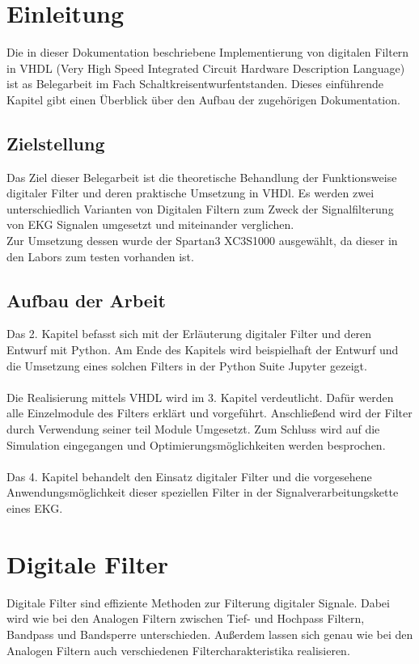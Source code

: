 \documentclass[
paper = a4,
fontsize = 11pt,
numbers=noenddot,
headsepline = true,
footsepline = true,
plainfootsepline = true,
parskip,								        %
listof = totoc,
bibliography = totoc,
index = totoc,
twoside = false
]{scrreprt}
\begin{document}
	
	
	
	\tableofcontents
	\newpage
	\listoffigures
	\newpage
	\setcounter{page}{1}
	
	\chapter{Einleitung}
	Die in dieser Dokumentation beschriebene Implementierung von digitalen Filtern in VHDL  (Very High Speed Integrated Circuit Hardware Description Language) ist as Belegarbeit im Fach \glqq Schaltkreisentwurf\grqq entstanden. Dieses einführende Kapitel gibt einen Überblick über den Aufbau der zugehörigen Dokumentation.
	
	\section{Zielstellung}
	Das Ziel dieser Belegarbeit ist die theoretische Behandlung der Funktionsweise digitaler Filter und deren praktische Umsetzung in VHDl. Es werden zwei unterschiedlich Varianten von Digitalen Filtern zum Zweck der Signalfilterung von EKG Signalen umgesetzt und miteinander verglichen.\\
	Zur Umsetzung dessen wurde der Spartan3 XC3S1000 ausgewählt, da dieser in den Labors zum testen vorhanden ist.
	\section{Aufbau der Arbeit}
	Das 2. Kapitel befasst sich mit der Erläuterung digitaler Filter und deren Entwurf mit Python. Am Ende des Kapitels wird beispielhaft der Entwurf und die Umsetzung eines solchen Filters in der Python Suite Jupyter gezeigt.\\
	\\
	Die Realisierung mittels VHDL wird im 3. Kapitel verdeutlicht. Dafür werden alle Einzelmodule des Filters erklärt und vorgeführt. Anschließend wird der Filter durch Verwendung seiner teil Module Umgesetzt. Zum Schluss wird auf die Simulation eingegangen und Optimierungsmöglichkeiten werden besprochen.\\
	\\
	Das 4. Kapitel behandelt den Einsatz digitaler Filter und die vorgesehene Anwendungsmöglichkeit dieser speziellen Filter in der Signalverarbeitungskette eines EKG.
	
	\chapter{Digitale Filter}
	Digitale Filter sind effiziente Methoden zur Filterung digitaler Signale. Dabei wird wie bei den Analogen Filtern zwischen Tief- und Hochpass Filtern, Bandpass und Bandsperre unterschieden. Außerdem lassen sich genau wie bei den Analogen Filtern auch verschiedenen Filtercharakteristika realisieren.
	
\end{document}
